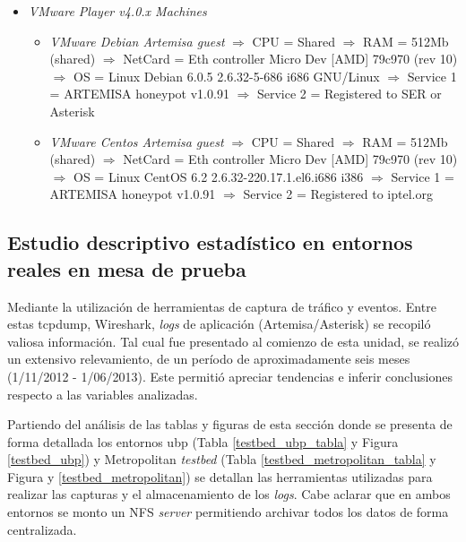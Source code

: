 \documentclass[a4paper,12pt]{report}
\begin{document}
\begin{itemize}
    \item \emph{VMware Player v4.0.x Machines}
    \begin{itemize}
     \item \emph{VMware Debian Artemisa guest}
	\subitem $\Rightarrow$ CPU = Shared
	\subitem $\Rightarrow$ RAM = 512Mb (shared)
	\subitem $\Rightarrow$ NetCard = Eth controller Micro
Dev [AMD] 79c970 (rev 10)
	\subitem $\Rightarrow$ OS = Linux Debian 6.0.5 2.6.32-5-686 i686 GNU/Linux
	\subitem $\Rightarrow$ Service 1 = ARTEMISA honeypot v1.0.91
	\subitem $\Rightarrow$ Service 2 = Registered to SER or Asterisk
\item \emph{VMware Centos Artemisa guest}
	\subitem $\Rightarrow$ CPU = Shared
	\subitem $\Rightarrow$ RAM = 512Mb (shared)
	\subitem $\Rightarrow$ NetCard = Eth controller Micro
Dev [AMD] 79c970 (rev 10)
	\subitem $\Rightarrow$ OS = Linux CentOS 6.2
2.6.32-220.17.1.el6.i686 i386
	\subitem $\Rightarrow$ Service 1 = ARTEMISA honeypot v1.0.91
	\subitem $\Rightarrow$ Service 2 = Registered to iptel.org
  \end{itemize}
\end{itemize}


\subsection{Estudio descriptivo estadístico en entornos reales en mesa de
prueba}

Mediante la utilización de herramientas de captura de tráfico y eventos. Entre
estas tcpdump, Wireshark, \emph{logs} de aplicación (Artemisa/Asterisk) se recopiló
valiosa información. Tal cual fue presentado al comienzo de esta unidad, se
realizó un extensivo relevamiento, de un período de aproximadamente seis
meses (1/11/2012 - 1/06/2013). Este permitió apreciar tendencias e
inferir conclusiones respecto a las variables analizadas.

Partiendo del análisis de las tablas y figuras de esta sección donde se presenta de forma
detallada los entornos \ac{ubp} (Tabla \ref{testbed_ubp_tabla} y Figura \ref{testbed_ubp})
y Metropolitan \emph{testbed} (Tabla \ref{testbed_metropolitan_tabla} y Figura y \ref{testbed_metropolitan}) 
se detallan las herramientas
utilizadas para realizar las capturas y el almacenamiento de los \emph{logs}. Cabe
aclarar que en ambos entornos se monto un NFS \emph{server} permitiendo archivar todos
los datos de forma centralizada.\\
\end{document}
